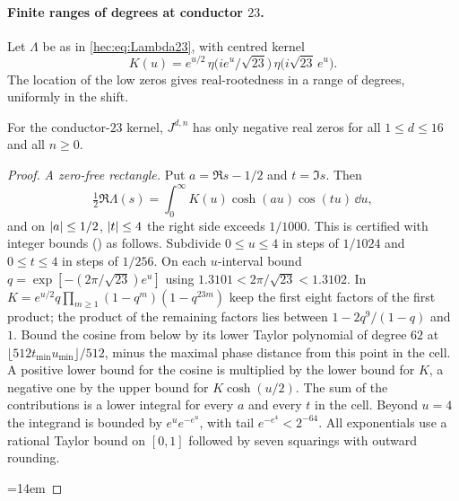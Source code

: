 \paragraph{Finite ranges of degrees at conductor $23$.}
Let $\Lambda$ be as in \eqref{hec:eq:Lambda23}, with centred kernel
\[
 K(u)=e^{u/2}\,\eta\bigl(ie^u/\sqrt{23}\bigr)\,\eta\bigl(i\sqrt{23}\,e^u\bigr).
\]
The location of the low zeros gives real-rootedness in a range of degrees, uniformly in the shift.

\begin{theorem}\label{hec:thm:sixteen}
For the conductor-$23$ kernel, $J^{d,n}$ has only negative real zeros for all $1\le d\le16$ and all
$n\ge0$.
\end{theorem}

\begin{proof}
\emph{A zero-free rectangle.} Put $a=\Re s-1/2$ and $t=\Im s$. Then
\[
 \tfrac12\Re\Lambda(s)=\int_0^\infty K(u)\cosh(au)\cos(tu)\,\dd u,
\]
and on $\lvert a\rvert\le1/2$, $\lvert t\rvert\le4$ the right side exceeds $1/1000$. This is certified with integer bounds
() as follows. Subdivide
$0\le u\le4$ in steps of $1/1024$ and $0\le t\le4$ in steps of $1/256$. On each $u$-interval bound
$q=\exp[-(2\pi/\sqrt{23})e^u]$ using $1.3101<2\pi/\sqrt{23}<1.3102$. In
$K=e^{u/2}q\prod_{m\ge1}(1-q^m)(1-q^{23m})$ keep the first eight factors of the first product; the product
of the remaining factors lies between $1-2q^9/(1-q)$ and $1$. Bound the cosine from below by its lower
Taylor polynomial of degree $62$ at $\lfloor512t_{\min}u_{\min}\rfloor/512$, minus the maximal phase
distance from this point in the cell. A positive lower bound for the cosine is multiplied by the lower
bound for $K$, a negative one by the upper bound for $K\cosh(u/2)$. The sum of the contributions is a
lower integral for every $a$ and every $t$ in the cell. Beyond $u=4$ the integrand is bounded by
$e^ue^{-e^u}$, with tail $e^{-e^4}<2^{-64}$. All exponentials use a rational Taylor bound on $[0,1]$
followed by seven squarings with outward rounding.
{\emergencystretch=14em\par}


\end{proof}
